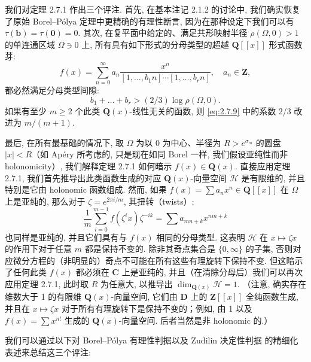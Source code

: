 我们对定理 2.7.1 作出三个评注. 
首先, 在基本注记 2.1.2 的讨论中, 我们确实恢复了原始 Borel--Pólya 定理中更精确的有理性断言, 因为在那种设定下我们可以有 \(\tau(\mathbf{b}) = \tau(\mathbf{0}) = 0\). 
其次, 在复平面中给定的、满足共形映射半径 \(\rho(\Omega,0) > 1\) 的单连通区域 \(\Omega \ni 0\) 上, 
所有具有如下形式的分母类型的超越 \(\mathbf{Q}[\![x]\!]\) 形式函数芽:
\begin{equation}\label{eq:2.7.8}
f(x) = \sum_{n=0}^{\infty} a_n \frac{x^n}{[1, \dots, b_1 n] \cdots [1, \dots, b_r n]}, \quad a_n \in \mathbf{Z},
\end{equation}
都必然满足分母类型间隙:
\begin{equation}\label{eq:2.7.9}
b_1 + \dots + b_r > (2/3) \log \rho(\Omega, 0).
\end{equation}
如果有至少 \(m \geq 2\) 个此类 \(\mathbf{Q}(x)\)-线性无关的函数, 则 \eqref{eq:2.7.9} 中的系数 2/3 改进为 \(m/(m+1)\).

最后, 在所有最基础的情况下, 取 \(\Omega\) 为以 0 为中心、半径为 \(R > e^{\sigma_m}\) 的圆盘 \(|x| < R\)（如 Apéry 所考虑的, 只是现在如同 Borel 一样, 我们假设亚纯性而非 holonomicity）, 我们解释定理 2.7.1 如何暗示 \(f(x) \in \mathbf{Q}(x)\).
直接应用定理 2.7.1, 我们首先推导出此类函数生成的对应 \(\mathbf{Q}(x)\)-向量空间 \(\mathcal{H}\) 是有限维的, 并且特别是它由 holonomic 函数组成.
然而, 如果 \(f(x) = \sum a_n x^n \in \mathbf{Q}[\![x]\!]\) 在 \(\Omega\) 上是亚纯的, 那么对于 \(\zeta = e^{2\pi i/m}\), 其扭转（twists）:
\[ \frac{1}{m} \sum_{i=0}^{m-1} f(\zeta^i x) \zeta^{-ik} = \sum a_{mn+k} x^{nm+k} \]
也同样是亚纯的, 并且它们具有与 \(f(x)\) 相同的分母类型.
这表明 \(\mathcal{H}\) 在 \(x \mapsto \zeta x\) 的作用下对于任意 \(m\) 都是保持不变的.
除非其奇点集合是 \(\{0, \infty\}\) 的子集, 否则对应微分方程的（非明显的）奇点不可能在所有这些有理旋转下保持不变.
但这暗示了任何此类 \(f(x)\) 都必须在 \(\mathbf{C}\) 上是亚纯的, 并且（在清除分母后）我们可以再次应用定理 2.7.1, 此时取 \(R\) 为任意大, 以推导出 \(\dim_{\mathbf{Q}(x)} \mathcal{H} = 1\).
（注意, 确实存在维数大于 1 的有限维 \(\mathbf{Q}(x)\)-向量空间, 它们由 \(\mathbf{D}\) 上的 \(\mathbf{Z}[\![x]\!]\) 全纯函数生成, 并且在 \(x \mapsto \zeta x\) 对于所有有理旋转下是保持不变的；例如, 由 1 以及 \(f(x) = \sum x^{n!}\) 生成的 \(\mathbf{Q}(x)\)-向量空间. 后者当然是非 holonomic 的.）

我们可以通过以下对 Borel--P{\'o}lya 有理性判据以及 Zudilin 决定性判据 \cite{Zud17} 的精细化表述来总结这三个评注:

